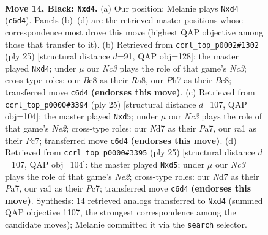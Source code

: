 \documentclass[11pt]{article}
\begin{document}
\clearpage

\begin{figure}[p]\centering
\begin{subfigure}{0.46\textwidth}\centering
\resizebox{\linewidth}{!}{%
\newchessgame
\chessboard[
  setfen={r1b1k2r/pp1nbppp/2n1p3/3pP3/3Q4/3B1PP1/P2N3P/R1B1K1NR b KQ - 0 14},
  showmover=false,
  pgfstyle=straightmove, color=movearrow, markmove={c6-d4}
]}
\caption{}
\end{subfigure}\hfill
\begin{subfigure}{0.46\textwidth}\centering
\resizebox{\linewidth}{!}{%
\newchessgame
\chessboard[
  setfen={r1b2rk1/pp1n1ppp/2n1p3/3pP3/3Q1P2/2N5/PPP3PP/2KR1B1R b - - 0 13},
  showmover=false,
  pgfstyle=straightmove, color=movearrow, markmove={c6-d4}
]}
\caption{}
\end{subfigure}
\\[4pt]
\begin{subfigure}{0.46\textwidth}\centering
\resizebox{\linewidth}{!}{%
\newchessgame
\chessboard[
  setfen={r1b1r1k1/ppp1np1p/5p2/3Q4/1b1Np3/4P3/PP1PBPPP/R1B1K2R b KQ - 0 13},
  showmover=false,
  pgfstyle=straightmove, color=movearrow, markmove={e7-d5}
]}
\caption{}
\end{subfigure}\hfill
\begin{subfigure}{0.46\textwidth}\centering
\resizebox{\linewidth}{!}{%
\newchessgame
\chessboard[
  setfen={r1b1r1k1/ppp1np1p/5p2/3Q4/1b1Np3/4P3/PP1PBPPP/R1B1K2R b KQ - 0 13},
  showmover=false,
  pgfstyle=straightmove, color=movearrow, markmove={e7-d5}
]}
\caption{}
\end{subfigure}
\caption{\textbf{Move 14, Black: \texttt{Nxd4}.} (a) Our position; Melanie plays \texttt{Nxd4} (\texttt{c6d4}). Panels (b)--(d) are the retrieved master positions whose correspondence most drove this move (highest QAP objective among those that transfer to it). (b) Retrieved from \texttt{ccrl\_top\_p0002\#1302} (ply 25) [structural distance $d$=91, QAP obj=128]: the master played \texttt{Nxd4}; under $\mu$ our \emph{Nc3} plays the role of that game's \emph{Nc3}; cross-type roles: our \emph{B}c8 as their \emph{R}a8, our \emph{P}h7 as their \emph{B}c8; transferred move \texttt{c6d4} \textbf{(endorses this move)}. (c) Retrieved from \texttt{ccrl\_top\_p0000\#3394} (ply 25) [structural distance $d$=107, QAP obj=104]: the master played \texttt{Nxd5}; under $\mu$ our \emph{Nc3} plays the role of that game's \emph{Ne2}; cross-type roles: our \emph{N}d7 as their \emph{P}a7, our \emph{r}a1 as their \emph{P}c7; transferred move \texttt{c6d4} \textbf{(endorses this move)}. (d) Retrieved from \texttt{ccrl\_top\_p0000\#3395} (ply 25) [structural distance $d$=107, QAP obj=104]: the master played \texttt{Nxd5}; under $\mu$ our \emph{Nc3} plays the role of that game's \emph{Ne2}; cross-type roles: our \emph{N}d7 as their \emph{P}a7, our \emph{r}a1 as their \emph{P}c7; transferred move \texttt{c6d4} \textbf{(endorses this move)}. Synthesis: 14 retrieved analogs transferred to \texttt{Nxd4} (summed QAP objective 1107, the strongest correspondence among the candidate moves); Melanie committed it via the \texttt{search} selector.}
\label{fig:thought-m27}
\end{figure}
\end{document}
